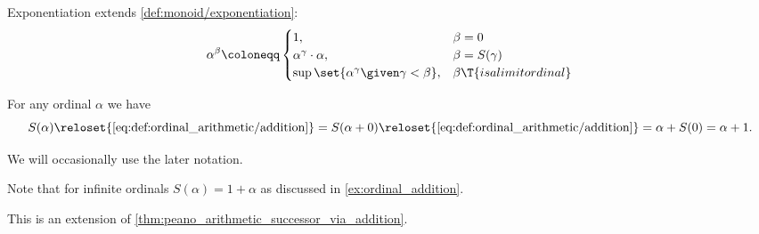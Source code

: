 \begin{definition}
\begin{thmenum}
     Exponentiation extends \cref{def:monoid/exponentiation}:
    \begin{equation}\label{eq:def:ordinal_arithmetic/exponentiation}
      \alpha^\beta \coloneqq \begin{cases}
        1,                                               &\beta = 0 \\
        \alpha^\gamma \cdot \alpha,                      &\beta = S(\gamma) \\
        \sup\set{ \alpha^\gamma \given \gamma < \beta }, &\beta \T{is a limit ordinal} \\
      \end{cases}
    \end{equation}
  \end{thmenum}
\end{definition}

\begin{remark}\label{rem:ordinal_successor_via_addition}
  For any ordinal \( \alpha \) we have
  \begin{equation*}
    S(\alpha)
    \reloset {\ref{eq:def:ordinal_arithmetic/addition}} =
    S(\alpha + 0)
    \reloset {\ref{eq:def:ordinal_arithmetic/addition}} =
    \alpha + S(0)
    =
    \alpha + 1.
  \end{equation*}

  We will occasionally use the later notation.

  Note that for infinite ordinals \( S(\alpha) = 1 + \alpha \) as discussed in \cref{ex:ordinal_addition}.

  This is an extension of \cref{thm:peano_arithmetic_successor_via_addition}.
\end{remark}

